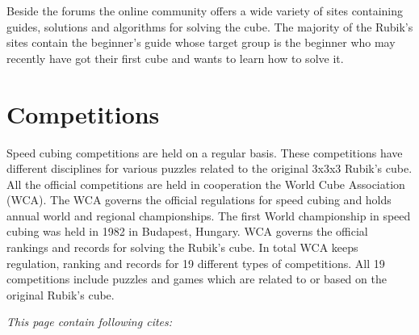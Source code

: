 Beside the forums the online community offers a wide variety of sites containing guides, solutions and algorithms for solving the cube. The majority of the Rubik's sites contain the beginner's guide\cite{jasminLee08} whose target group is the beginner who may recently have got their first cube and wants to learn how to solve it. %

\section{Competitions}
\label{sec:wca}
Speed cubing competitions are held on a regular basis\cite{wca/competitions}. These competitions have different disciplines for various puzzles related to the original 3x3x3 Rubik's cube. All the official competitions are held in cooperation the World Cube Association (WCA). The WCA governs the official regulations for speed cubing and holds annual world and regional championships. The first World championship in speed cubing was held in 1982 in Budapest, Hungary. WCA governs the official rankings and records for solving the Rubik's cube. In total WCA keeps regulation, ranking and records for 19 different types of competitions. All 19 competitions include puzzles and games which are related to or based on the original Rubik's cube. 

\textit{This page contain following cites: }
 \cite{speedsolving.com}
\cite{speedcubing.dk}
\cite{wca}
\cite{wca/competitions}
\cite{jasminLee08}

%